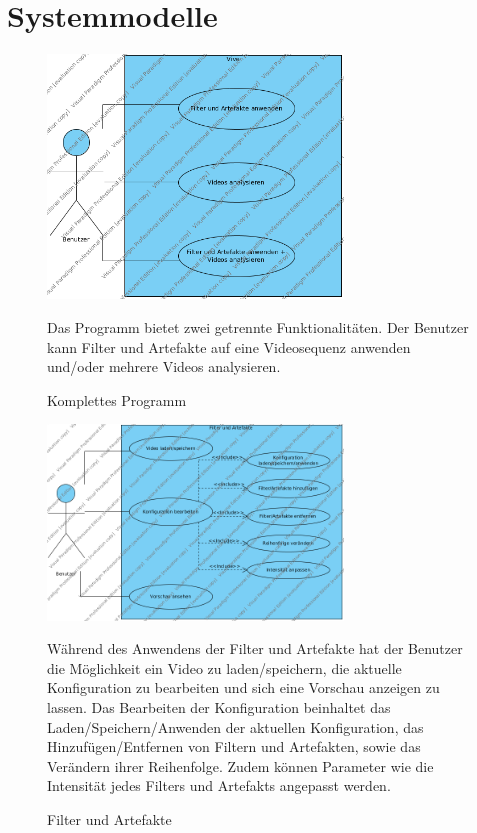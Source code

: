 \documentclass[parskip=full]{scrartcl}
\begin{document}
\section{Systemmodelle}
\begin{figure}[htbp]
\centering
\includegraphics[width=0.7\textwidth]{UsecaseDiagrams/Vive.png}
\caption{Komplettes Programm}
\begin{flushleft}
Das Programm bietet zwei getrennte Funktionalitäten. Der Benutzer kann Filter und Artefakte auf eine Videosequenz anwenden und/oder mehrere Videos analysieren.
\end{flushleft}
\end{figure}
\begin{figure}[htbp]
\centering
\includegraphics[width=0.7\textwidth]{UsecaseDiagrams/Filter_und_Artefakte.png}
\caption{Filter und Artefakte}
\begin{flushleft}
Während des Anwendens der Filter und Artefakte hat der Benutzer die Möglichkeit ein Video zu laden/speichern, die aktuelle Konfiguration zu bearbeiten und sich eine Vorschau anzeigen zu lassen. Das Bearbeiten der Konfiguration beinhaltet das Laden/Speichern/Anwenden der aktuellen Konfiguration, das Hinzufügen/Entfernen von Filtern und Artefakten, sowie das Verändern ihrer Reihenfolge. Zudem können Parameter wie die Intensität jedes Filters und Artefakts angepasst werden.
\end{flushleft}
\end{figure}
\end{document}
